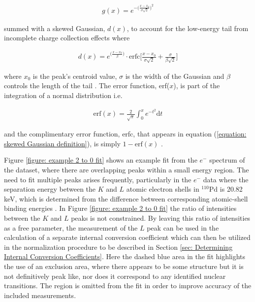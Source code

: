 \begin{gather}
g(x) = e^{-\big(\frac{x-x_0}{\sigma \sqrt{2}}\big)^2}
\label{equation: Gaussian definition}
\end{gather}

summed with a skewed Gaussian, $d(x)$, to account for the low-energy tail from incomplete charge collection effects where

\begin{gather}
d(x) = e^{\big(\frac{x-x_0}{\beta}\big)} \cdot \mathrm{erfc}\Bigg[\frac{x-x_0}{\sigma \sqrt{2}} + \frac{\sigma}{\beta \sqrt{2}}\Bigg]
\label{equation: skewed Gaussian definition}
\end{gather}

where $x_0$ is the peak's centroid value, $\sigma$ is the width of the Gaussian and $\beta$ controls the length of the tail \cite{Radford2016}. The error function, erf($x$), is part of the integration of a normal distribution i.e.

\begin{gather}
\mathrm{erf}(x) = \frac{2}{\sqrt{\pi}}\int^x_0 e^{-t^2}\mathrm{d}t
\label{equation: erf(x) definition}
\end{gather}

and the complimentary error function, erfc, that appears in equation (\ref{equation: skewed Gaussian definition}), is simply $1-\mathrm{erf}(x)$ \cite{AndrewsText}.

Figure \ref{figure: example 2 to 0 fit} shows an example fit from the $e^-$ spectrum of the dataset, where there are overlapping peaks within a small energy region. The need to fit multiple peaks arises frequently, particularly in the $e^-$ data where the separation energy between the $K$ and $L$ atomic electron shells in $^{110}\mathrm{Pd}$ is 20.82 keV, which is determined from the difference between corresponding atomic-shell binding energies \cite{KIBEDI2008202}. In Figure \ref{figure: example 2 to 0 fit} the ratio of intensities between the $K$ and $L$ peaks is not constrained. By leaving this ratio of intensities as a free parameter, the measurement of the $L$ peak can be used in the calculation of a separate internal conversion coefficient which can then be utilized in the normalization procedure to be described in Section \ref{sec: Determining Internal Conversion Coefficients}. Here the dashed blue area in the fit highlights the use of an exclusion area, where there appears to be some structure but it is not definitively peak like, nor does it correspond to any identified nuclear transitions. The region is omitted from the fit in order to improve accuracy of the included measurements.


